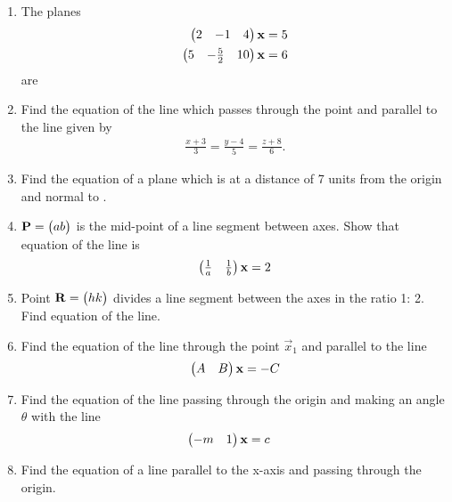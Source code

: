 \documentclass[journal,12pt,twocolumn]{IEEEtran}
\renewcommand\thesection{\arabic{section}}
\begin{document}
\begin{enumerate}[label=\thesection.\arabic*.,ref=\thesection.\theenumi]
\item The planes 
%
\begin{align}
\begin{pmatrix}2 & -1 & 4\end{pmatrix}\mathbf{x}&=5
\\
\begin{pmatrix}5 & -\frac{5}{2} & 10\end{pmatrix}\mathbf{x}&=6
\end{align}
%
are 
%
\begin{enumerate}[itemsep=2pt]
\end{enumerate}
%
\item Find the equation of the line which passes through  the point  and parallel to the line given by 
\begin{align}
\frac{x+3}{3} = \frac{y-4}{5} = \frac{z+8}{6}. 
\end{align}
\item Find the equation of a plane which is at a distance of 7 units from the origin and normal to .
%
\item $\mathbf{P}=\begin{pmatrix}a b\end{pmatrix}$ is the mid-point of a line segment between axes. Show that equation of the line is
\begin{align}
\begin{pmatrix}\frac{1}{a} & \frac{1}{b}\end{pmatrix}\mathbf{x} = 2
\end{align}
\item  Point $\mathbf{R}= \begin{pmatrix}h k\end{pmatrix}$ divides a line segment between the axes in the ratio 1: 2. Find equation of the line.
\item Find the equation of the line through the point $\vec{x}_1$ and parallel to the line
%
\begin{align}
\begin{pmatrix}A & B\end{pmatrix}\mathbf{x} = -C
\end{align}
%
\item Find the equation of the line passing through the origin and making an angle $\theta$ with the line %
\begin{align}
\begin{pmatrix}-m & 1\end{pmatrix}\mathbf{x} &= c
\end{align}
%
\solution
%
\item Find the equation of a line parallel to the x-axis and passing through the origin.

\end{enumerate}
\end{document}

